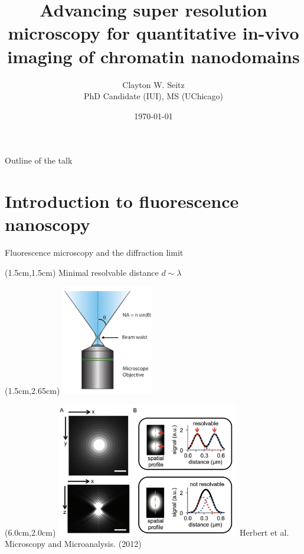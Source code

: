 \documentclass{beamer}					%
\title{Advancing super resolution microscopy for quantitative in-vivo imaging of chromatin nanodomains}	%
\author{Clayton W. Seitz\\ PhD Candidate (IUI), MS (UChicago)}								%
\date{\today}									%
\begin{document}
\begin{frame}
  \titlepage
\end{frame}

\begin{frame}{Outline of the talk}
    \tableofcontents
\end{frame}



%

\section{Introduction to fluorescence nanoscopy}

\begin{frame}{Fluorescence microscopy and the diffraction limit}

\begin{textblock*}{10cm}(1.5cm,1.5cm)
Minimal resolvable distance $d \sim \lambda$
\end{textblock*}

\begin{textblock*}{4cm}(1.5cm,2.65cm)
\includegraphics[width=4cm]{../../dissertation/dissertation/media/Objective}
\end{textblock*}

\begin{textblock*}{8cm}(6.0cm,2.0cm)
\includegraphics[width=8cm]{../../dissertation/dissertation/media/PSF}
Herbert et al. Microscopy and Microanalysis. (2012)
\end{textblock*}


\end{frame}
\end{document}
